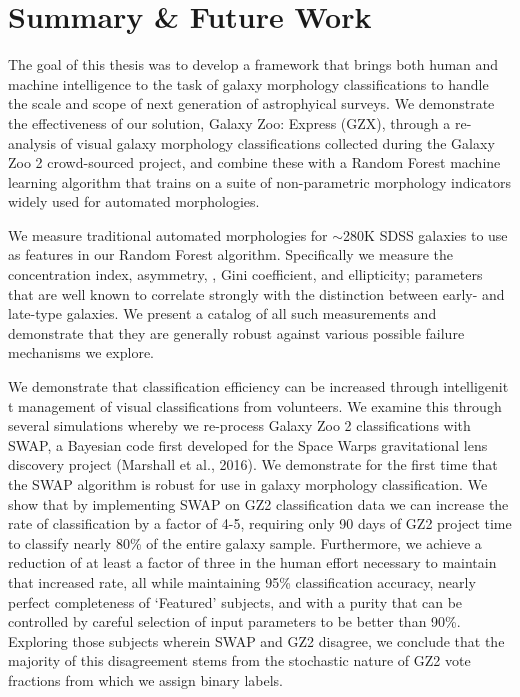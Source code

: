 \chapter{Summary \& Future Work}
\label{chap:summary}

The goal of this thesis was to develop a framework that brings both human and machine intelligence to the task of galaxy morphology classifications to handle the scale and scope of next generation of astrophyical surveys. We demonstrate the effectiveness of our solution, Galaxy Zoo: Express (GZX), through a re-analysis of visual galaxy morphology classifications collected during the Galaxy Zoo 2 crowd-sourced project, and combine these with a Random Forest machine learning algorithm that trains on a suite of non-parametric morphology indicators widely used for automated morphologies. 

We measure traditional automated morphologies for $\sim$280K SDSS galaxies to use as features in our Random Forest algorithm. Specifically we measure the concentration index, asymmetry, , Gini coefficient, and ellipticity; parameters that are well known to correlate strongly with the distinction between early- and late-type galaxies. We present a catalog of all such measurements and demonstrate that they are generally robust against various possible failure mechanisms we explore.


We demonstrate that classification efficiency can be increased through intelligenit t management of visual classifications from volunteers. We examine this through several simulations whereby we re-process Galaxy Zoo 2 classifications with SWAP, a Bayesian code first developed for the Space Warps gravitational lens discovery project (Marshall et al., 2016). We demonstrate for the first time that the SWAP algorithm is robust for use in galaxy morphology classification. We show that by implementing SWAP on GZ2 classification data we can increase the rate of classification by a factor of 4-5, requiring only 90 days of GZ2 project time to classify nearly 80\% of the entire galaxy sample. Furthermore, we achieve a reduction of at least a factor of three in the human effort necessary to maintain that increased rate, all while maintaining 95\% classification accuracy, nearly perfect completeness of ‘Featured’ subjects, and with a purity that can be controlled by careful selection of input parameters to be better than 90\%. Exploring those subjects wherein SWAP and GZ2 disagree, we conclude that the majority of this disagreement stems from the stochastic nature of GZ2 vote fractions from which we assign binary labels. 

